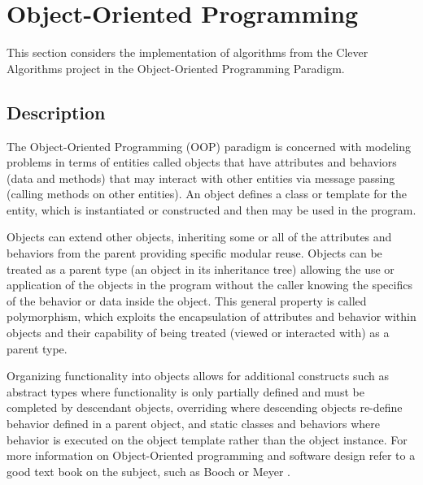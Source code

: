 \documentclass[a4paper, 11pt]{article}
\begin{document}


\section{Object-Oriented Programming}
\label{sec:oop}
This section considers the implementation of algorithms from the Clever Algorithms project in the Object-Oriented Programming Paradigm.

\subsection{Description}
The Object-Oriented Programming (OOP) paradigm is concerned with modeling problems in terms of entities called objects that have attributes and behaviors (data and methods) that may interact with other entities via message passing (calling methods on other entities). An object defines a class or template for the entity, which is instantiated or constructed and then may be used in the program.

Objects can extend other objects, inheriting some or all of the attributes and behaviors from the parent providing specific modular reuse. Objects can be treated as a parent type (an object in its inheritance tree) allowing the use or application of the objects in the program without the caller knowing the specifics of the behavior or data inside the object. This general property is called polymorphism, which exploits the encapsulation of attributes and behavior within objects and their capability of being treated (viewed or interacted with) as a parent type.

Organizing functionality into objects allows for additional constructs such as abstract types where functionality is only partially defined and must be completed by descendant objects, overriding where descending objects re-define behavior defined in a parent object, and static classes and behaviors where behavior is executed on the object template rather than the object instance. 
For more information on Object-Oriented programming and software design refer to a good text book on the subject, such as Booch \cite{Booch1997} or Meyer \cite{Meyer1997}.
\end{document}
